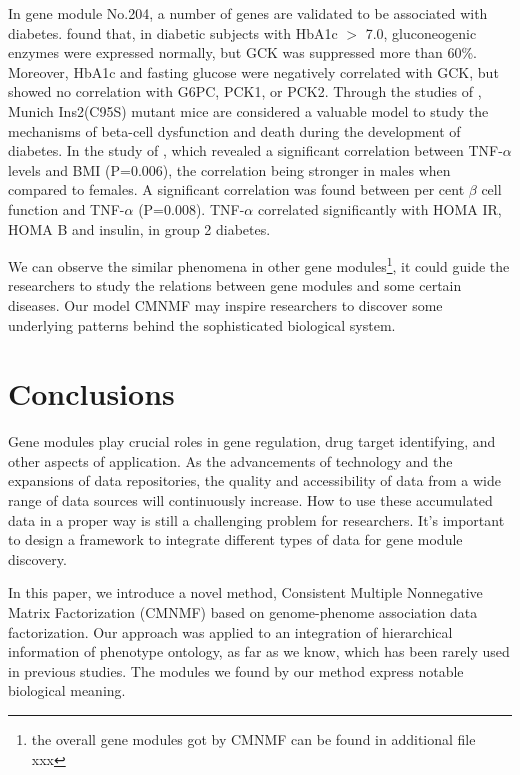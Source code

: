 \documentclass{bmcart}
\begin{document}
In gene module No.204, a number of genes are validated to be associated with diabetes. \cite{Haeusler2015} found that, in diabetic subjects with HbA1c $>$ 7.0, gluconeogenic enzymes were expressed normally, but GCK was suppressed more than 60\%. Moreover, HbA1c and fasting glucose were negatively correlated with GCK, but showed no correlation with G6PC, PCK1, or PCK2.
Through the studies of \cite{Herbach2007}, Munich Ins2(C95S) mutant mice are considered a valuable model to study the mechanisms of beta-cell dysfunction and death during the development of diabetes.
 In the study of \cite{Swaroop2012}, which revealed a significant correlation between TNF-$\alpha$ levels and BMI (P=0.006), the correlation being stronger in males when compared to females. A significant correlation was found between per cent $\beta$ cell function and TNF-$\alpha$ (P=0.008). TNF-$\alpha$ correlated significantly with HOMA IR, HOMA B and insulin, in group 2 diabetes.

 We can observe the similar phenomena in other gene modules\footnote{the overall gene modules got by CMNMF can be found in additional file xxx}, it could guide the researchers to study the relations between gene modules and some certain diseases. Our model CMNMF may inspire researchers to discover some underlying patterns behind the sophisticated biological system.

\section*{Conclusions}
Gene modules play crucial roles in gene regulation, drug target identifying, and other aspects of application. As the advancements of technology and the expansions of data repositories, the quality and accessibility of data from a wide range of data sources will continuously increase. How to use these accumulated data in a proper way is still a challenging problem for researchers. It's important to design a framework to integrate different types of data for gene module discovery.

In this paper, we introduce a novel method, Consistent Multiple Nonnegative Matrix Factorization (CMNMF) based on genome-phenome association data factorization. Our approach was applied to an integration of hierarchical information of phenotype ontology, as far as we know, which has been rarely used in previous studies. The modules we found by our method express notable biological meaning.
\end{document}
